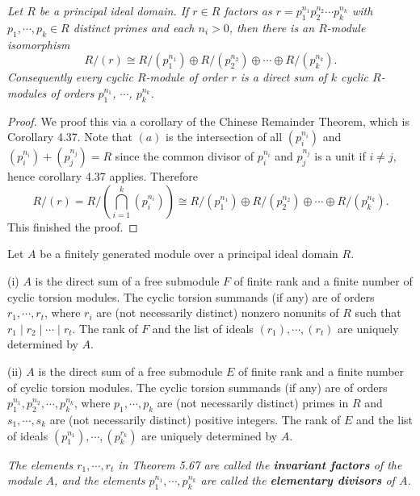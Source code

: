 \begin{lemma}\em
Let $R$ be a principal ideal domain. If $r\in R$ factors as $r=p_1^{n_1}p_2^{n_2}\cdots p_k^{n_k}$ with $p_1,\cdots,p_k\in R$ distinct primes and each $n_i>0$, then there is an $R$-module isomorphism 
$$
R/\left( r \right) \cong R/\left( p_{1}^{n_1} \right) \oplus R/\left( p_{2}^{n_2} \right) \oplus \cdots \oplus R/\left( p_{k}^{n_k} \right) .
$$
Consequently every cyclic $R$-module of order $r$ is a direct sum of $k$ cyclic $R$-modules of orders $p_1^{n_1}$, $\cdots$, $p_k^{n_k}$.
\end{lemma}
\begin{proof}
We proof this via a corollary of the Chinese Remainder Theorem, which is Corollary 4.37. Note that $(a)$ is the intersection of all $(p_i^{n_i})$ and $(p_i^{n_i})+(p_j^{n_j})=R$ since the common divisor of $p_i^{n_i}$ and $p_j^{n_j}$ is a unit if $i\ne j$, hence corollary 4.37 applies. Therefore 
$$
R/\left( r \right) =R/\left( \bigcap_{i=1}^k{\left( p_{i}^{n_i} \right)} \right) \cong R/\left( p_{1}^{n_1} \right) \oplus R/\left( p_{2}^{n_2} \right) \oplus \cdots \oplus R/\left( p_{k}^{n_k} \right) .
$$
This finished the proof.
\end{proof}
\begin{theorem}
Let $A$ be a finitely generated module over a principal ideal domain $R$.\par
(i) $A$ is the direct sum of a free submodule $F$ of finite rank and a finite number of cyclic torsion modules. The cyclic torsion summands (if any) are of orders $r_1,\cdots,r_t$, where $r_i$ are (not necessarily distinct) nonzero nonunits of $R$ such that $r_1\mid r_2\mid\cdots\mid r_t$. The rank of $F$ and the list of ideals $(r_1),\cdots,(r_t)$ are uniquely determined by $A$.\par
(ii) $A$ is the direct sum of a free submodule $E$ of finite rank and a finite number of cyclic torsion modules. The cyclic torsion summands (if any) are of orders $p_1^{n_1},p_2^{n_2},\cdots,p_k^{n_k}$, where $p_1,\cdots,p_k$ are (not necessarily distinct) primes in $R$ and $s_1,\cdots,s_k$ are (not necessarily distinct) positive integers. The rank of $E$ and the list of ideals $(p_1^{n_1}),\cdots,(p_k^{r_k})$ are uniquely determined by $A$.
\end{theorem}
\begin{note}\em
The elements $r_1,\cdots,r_t$ in Theorem 5.67 are called the \textbf{invariant factors} of the module $A$, and the elements $p_1^{n_1},\cdots,p_k^{n_k}$ are called the \textbf{elementary divisors} of $A$.
\end{note}
